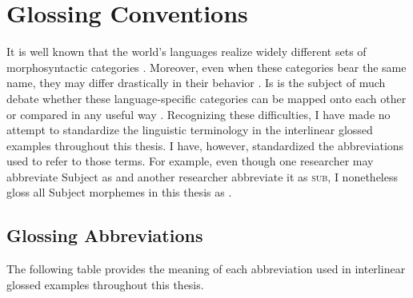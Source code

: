 \chapter{Glossing Conventions}

It is well known that the world's languages realize widely different sets of morphosyntactic categories . Moreover, even when these categories bear the same name, they may differ drastically in their behavior . Is is the subject of much debate whether these language-specific categories can be mapped onto each other or compared in any useful way . Recognizing these difficulties, I have made no attempt to standardize the linguistic terminology in the interlinear glossed examples throughout this thesis. I have, however, standardized the abbreviations used to refer to those terms. For example, even though one researcher may abbreviate Subject as  and another researcher abbreviate it as \textsc{sub}, I nonetheless gloss all Subject morphemes in this thesis as .

\section{Glossing Abbreviations}

The following table provides the meaning of each abbreviation used in interlinear glossed examples throughout this thesis.

